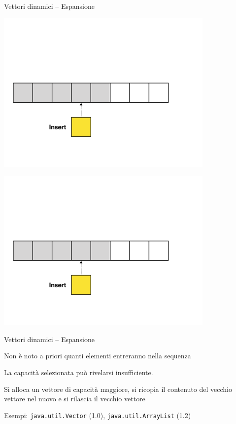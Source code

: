 \begin{frame}{Vettori dinamici -- Espansione}
\begin{overprint}
\centerline{\includegraphics[width=0.8\textwidth,page=4]{append-insert.pdf}}
\centerline{\includegraphics[width=0.8\textwidth,page=5]{append-insert.pdf}}
\end{overprint}

\end{frame}

\begin{frame}{Vettori dinamici -- Espansione}


\begin{myboxtitle}[Problema]
\BI
\item Non è noto a priori quanti elementi entreranno nella sequenza
\item La capacità selezionata può rivelarsi insufficiente.
\EI
\end{myboxtitle}

\begin{myboxtitle}[Soluzione]
\BI
\item Si alloca un vettore di capacità maggiore, si ricopia il contenuto del vecchio vettore nel nuovo e si rilascia il vecchio vettore
\item Esempi: \texttt{java.util.Vector} (1.0), \texttt{java.util.ArrayList} (1.2)
\EI
\end{myboxtitle}


\end{frame}

